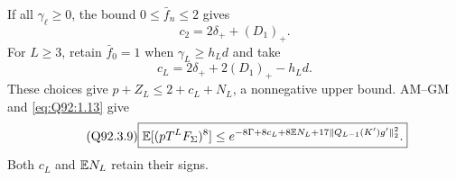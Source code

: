 If all \(\gamma_\ell\ge\allowbreak 0\), the bound \(0\le\allowbreak \bar f_n\le\allowbreak 2\) gives
\begin{equation}\tag{Q92.3.7}\label{eq:Q92:3.7}
c_2=2\delta_++(D_1)_+.
\end{equation}
For \(L\ge\allowbreak 3\), retain \(\bar f_0=\allowbreak 1\) when \(\gamma_L\ge\allowbreak  h_Ld\) and take
\begin{equation}\tag{Q92.3.8}\label{eq:Q92:3.8}
c_L=2\delta_++2(D_1)_+-h_Ld.
\end{equation}
These choices give \(p+Z_L\le\allowbreak 2+c_L+N_L\), a nonnegative upper bound.
AM--GM and \eqref{eq:Q92:1.13} give
\begin{equation}\tag{Q92.3.9}\label{eq:Q92:3.9}
\boxed{\mathbb E[(pT^LF_\Sigma)^8]\le
e^{-8\Gamma+8c_L+8\mathbb E N_L+17\|Q_{L-1}(K')g'\|_2^2}.}
\end{equation}
Both \(c_L\) and \(\mathbb E N_L\) retain their signs.

